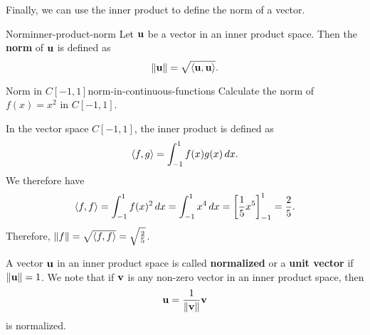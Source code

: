 Finally, we can use the inner product to define the norm of a vector.

\begin{definition}{Norm}{inner-product-norm}
  Let $\mbox{\bf u}$ be a vector in an inner product space. Then the
  \textbf{norm}%
   of $\mbox{\bf u}$ is defined as
  \begin{equation*}
    \left\|\mbox{\bf u}\right\| = \sqrt{\langle\mbox{\bf u},\mbox{\bf u}\rangle}.
  \end{equation*}
\end{definition}

\begin{example}{Norm in $C[-1,1]$}{norm-in-continuous-functions}
  Calculate the norm of $f(x) = x^2$ in $C[-1,1]$.
\end{example}

\begin{solution}
  In the vector space $C[-1,1]$, the inner product is defined as
  \begin{equation*}
    \langle f,g\rangle = \int_{-1}^{1} f(x)g(x)\,dx.
  \end{equation*}
  We therefore have
  \begin{equation*}
    \langle f,f\rangle
    = \int_{-1}^{1} f(x)^2\, dx
    = \int_{-1}^{1} x^4\, dx
    = \left[\frac{1}{5}x^5\right]_{-1}^{1}
    = \frac{2}{5}.
  \end{equation*}
  Therefore, $\left\|f\right\| = \sqrt{\langle f,f\rangle} = \sqrt{\frac{2}{5}}$.
\end{solution}

A vector $\mbox{\bf u}$ in an inner product space is called
\textbf{normalized}%
%
 or a \textbf{unit vector}%
%
 if $\left\|\mbox{\bf u}\right\| = 1$.
We note that if $\mbox{\bf v}$ is any non-zero vector in an inner product
space, then
\begin{equation*}
  \mbox{\bf u} = \frac{1}{\left\|\mbox{\bf v}\right\|} \mbox{\bf v}
\end{equation*}
is normalized.
